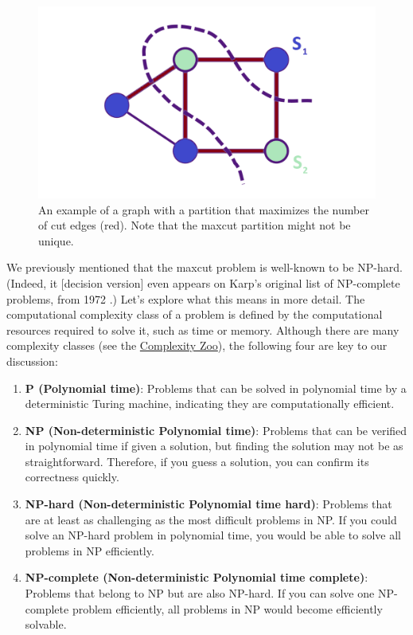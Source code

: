 \begin{figure}[H]
  \centering
  \includegraphics[width=\textwidth]{Figures/Diagrams/MaxCut.png}
  \caption{An example of a graph with a partition that maximizes the number of cut edges (red). Note that the \acrshort{maxcut} partition might not be unique.}
  \label{fig:MaxCut}
\end{figure}

We previously mentioned that the \acrshort{maxcut} problem is well-known to be NP-hard. (Indeed, it [decision version] even appears on Karp's original list of NP-complete problems, from 1972 \cite{Karp2010}.) Let's explore what this means in more detail. The computational complexity class of a problem is defined by the computational resources required to solve it, such as time or memory. Although there are many complexity classes (see the \href{https://complexityzoo.net/Complexity_Zoo}{Complexity Zoo}), the following four are key to our discussion:

\begin{enumerate}
  \item \textbf{P (Polynomial time)}: Problems that can be solved in polynomial time by a deterministic Turing machine, indicating they are computationally efficient.
  \item \textbf{NP (Non-deterministic Polynomial time)}: Problems that can be verified in polynomial time if given a solution, but finding the solution may not be as straightforward. Therefore, if you guess a solution, you can confirm its correctness quickly.
  \item \textbf{NP-hard (Non-deterministic Polynomial time hard)}: Problems that are at least as challenging as the most difficult problems in NP. If you could solve an NP-hard problem in polynomial time, you would be able to solve all problems in NP efficiently.
  \item \textbf{NP-complete (Non-deterministic Polynomial time complete)}: Problems that belong to NP but are also NP-hard. If you can solve one NP-complete problem efficiently, all problems in NP would become efficiently solvable.
\end{enumerate}

